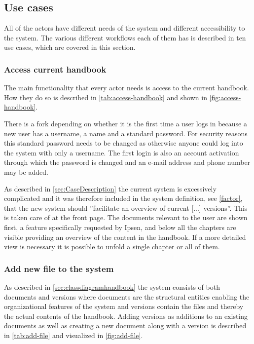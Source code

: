 \subsection{Use cases} \label{sec:usecases}
All of the actors have different needs of the system and different accessibility to the system. The various different workflows each of them has is described in ten use cases, which are covered in this section.

\subsubsection{Access current handbook}
The main functionality that every actor needs is access to the current handbook. How they do so is described in \cref{tab:access-handbook} and shown in \cref{fig:access-handbook}.




There is a fork depending on whether it is the first time a user logs in because a new user has a username, a name and a standard password.
For security reasons this standard password needs to be changed as otherwise anyone could log into the system with only a username.
The first login is also an account activation through which the password is changed and an e-mail address and phone number may be added.

As described in \cref{sec:CaseDescription} the current system is excessively complicated and it was therefore included in the system definition, see \cref{factor}, that the new system should ''facilitate an overview of current [...] versions''.
This is taken care of at the front page.
The documents relevant to the user are shown first, a feature specifically requested by Ipsen, and below all the chapters are visible providing an overview of the content in the handbook.
If a more detailed view is necessary it is possible to unfold a single chapter or all of them.


\subsubsection{Add new file to the system}
As described in \cref{sec:classdiagramhandbook} the system consists of both documents and versions where documents are the structural entities enabling the organizational features of the system and versions contain the files and thereby the actual contents of the handbook.
Adding versions as additions to an existing documents as well as creating a new document along with a version is described in \cref{tab:add-file} and visualized in \cref{fig:add-file}.

